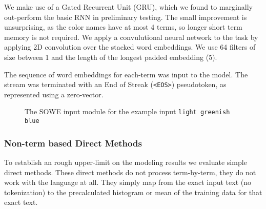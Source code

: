 \documentclass[11pt,a4paper]{article}
\newcommand{\natlang}[1]{\texttt{#1}}
\begin{document}
We make use of a Gated Recurrent Unit (GRU), 
which we found to marginally out-perform the basic RNN in preliminary testing.
The small improvement is unsurprising, as the color names have at most 4 terms,
so longer short term memory is not required.
We apply a convulutional neural network to the task by applying 2D convolution over the stacked word embeddings.
We use 64 filters of size between 1 and the length of the longest padded embedding (5).

The sequence of word embeddings for each-term was input to the model.
The stream was terminated with an End of Streak (\natlang{<EOS>}) pseudotoken,
as represented using a zero-vector.


\begin{figure}
	
	\caption{The SOWE input module for the example input \natlang{light greenish blue}}
	\label{fig:sowemod}
\end{figure}



\subsubsection{Non-term based Direct Methods}
To establish an rough upper-limit on the modeling results
we evaluate simple direct methods.
These direct methods do not process term-by-term, they do not work with the language at all.
They simply map from the exact input text (no tokenization) to the precalculated histogram or mean of the training data for that exact text.
\end{document}
